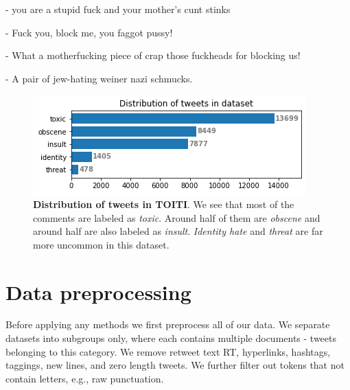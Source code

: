 \documentclass[fleqn,moreauthors,10pt]{ds_report}
\newcommand\bm{0.2pt}
\begin{document}
\begin{tcolorbox}[width=0.9\linewidth, center,arc=8pt,sharp corners=downhill, boxrule=0.3pt, left=\bm, top=\bm, right=\bm, bottom=\bm, fontupper=\small]
 - you are a stupid fuck and your mother's cunt stinks
\end{tcolorbox}

\begin{tcolorbox}[width=0.9\linewidth, center,arc=8pt,sharp corners=downhill, boxrule=0.3pt, left=\bm, top=\bm, right=\bm, bottom=\bm, fontupper=\small]
 - Fuck you, block me, you faggot pussy!
\end{tcolorbox}

\begin{tcolorbox}[width=0.9\linewidth, center,arc=8pt,sharp corners=downhill, boxrule=0.3pt, left=\bm, top=\bm, right=\bm, bottom=\bm, fontupper=\small]
 - What a motherfucking piece of crap those fuckheads for blocking us!
\end{tcolorbox}

\begin{tcolorbox}[width=0.9\linewidth, center,arc=8pt,sharp corners=downhill, boxrule=0.3pt, left=\bm, top=\bm, right=\bm, bottom=\bm, fontupper=\small]
 - A pair of jew-hating weiner nazi schmucks.
\end{tcolorbox}


\begin{figure}
	\includegraphics[width=\linewidth]{distribution_wiki_dataset.png}
	\caption{\textbf{Distribution of tweets in TOITI}. We see that most of the comments are labeled as \textit{toxic}. Around half of them are \textit{obscene} and around half are also labeled as \textit{insult}. \textit{Identity hate} and \textit{threat} are far more uncommon in this dataset.}
	\label{fig:distribution_wiki_dataset}
\end{figure}

\section{Data preprocessing}
\label{sec:preprocess}
Before applying any methods we first preprocess all of our data. We separate datasets into subgroups only, where each contains multiple documents - tweets belonging to this category. We remove retweet text RT, hyperlinks, hashtags, taggings, new lines, and zero length tweets. We further filter out tokens that not contain letters, e.g., raw punctuation.
\end{document}
